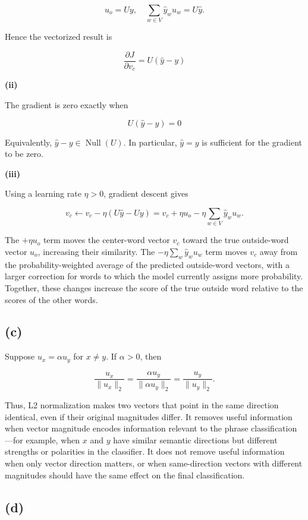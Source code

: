 \documentclass[a4paper,10pt]{article}
\begin{document}
\[
u_o = Uy,\quad \sum_{w\in V}\hat{y}_w u_w = U\hat{y}.
\]

Hence the vectorized result is

\[
\frac{\partial J}{\partial v_c}=U(\hat{y}-y)
\]

\textbf{(ii)}

The gradient is zero exactly when

\[
U(\hat{y}-y)=0
\]

Equivalently, \(\hat{y}-y\in\operatorname{Null}(U)\). In particular, \(\hat{y}=y\) is sufficient for the gradient to be zero.

\textbf{(iii)}

Using a learning rate \(\eta>0\), gradient descent gives

\[
v_c \leftarrow v_c-\eta\left(U\hat{y}-Uy\right) =v_c+\eta u_o-\eta\sum_{w\in V}\hat{y}_w u_w.
\]

The \(+\eta u_o\) term moves the center-word vector \(v_c\) toward the true outside-word vector \(u_o\), increasing their similarity. The \(-\eta\sum_w\hat{y}_w u_w\) term moves \(v_c\) away from the probability-weighted average of the predicted outside-word vectors, with a larger correction for words to which the model currently assigns more probability. Together, these changes increase the score of the true outside word relative to the scores of the other words.

\subsection{(c)}\label{c}

Suppose \(u_x=\alpha u_y\) for \(x\neq y\). If \(\alpha>0\), then

\[
\frac{u_x}{\lVert u_x\rVert_2} =\frac{\alpha u_y}{\lVert \alpha u_y\rVert_2} =\frac{u_y}{\lVert u_y\rVert_2}.
\]

Thus, L2 normalization makes two vectors that point in the same direction identical, even if their original magnitudes differ. It removes useful information when vector magnitude encodes information relevant to the phrase classification---for example, when \(x\) and \(y\) have similar semantic directions but different strengths or polarities in the classifier. It does not remove useful information when only vector direction matters, or when same-direction vectors with different magnitudes should have the same effect on the final classification.

\subsection{(d)}\label{d}
\end{document}
